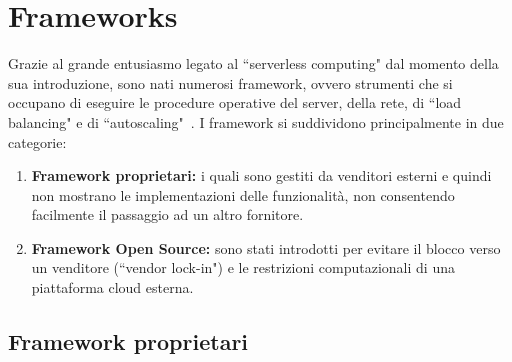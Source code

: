 \documentclass[12pt,a4paper,openany,twoside]{book}
\begin{document}





\chapter{Frameworks}
\label{chap:frameworks}

Grazie al grande entusiasmo legato al ``serverless computing" dal momento della sua introduzione, sono nati numerosi framework, ovvero strumenti che si occupano di eseguire le procedure operative del server, della rete, di ``load balancing" e di ``autoscaling"~\cite{Palade2019}.
I framework si suddividono principalmente in due categorie:
\begin{enumerate}
    \item \textbf{Framework proprietari:} i quali sono gestiti da venditori esterni e quindi non mostrano le implementazioni delle funzionalità, non consentendo facilmente il passaggio ad un altro fornitore.
    \item \textbf{Framework Open Source:} sono stati introdotti per evitare il blocco verso un venditore (``vendor lock-in") e le restrizioni computazionali di una piattaforma cloud esterna.
\end{enumerate}

\section{Framework proprietari}
\end{document}
